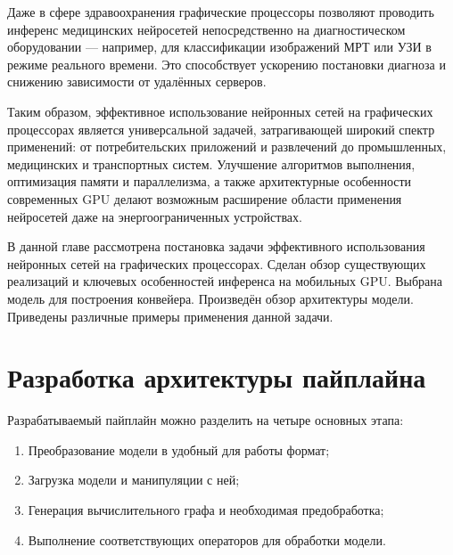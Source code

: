 \documentclass[a4paper,14pt]{extreport}
\begin{document}
        Даже в сфере здравоохранения графические процессоры позволяют проводить инференс медицинских нейросетей непосредственно на диагностическом оборудовании — например, для классификации изображений МРТ или УЗИ в режиме реального времени. Это способствует ускорению постановки диагноза и снижению зависимости от удалённых серверов.
        
        Таким образом, эффективное использование нейронных сетей на графических процессорах является универсальной задачей, затрагивающей широкий спектр применений: от потребительских приложений и развлечений до промышленных, медицинских и транспортных систем. Улучшение алгоритмов выполнения, оптимизация памяти и параллелизма, а также архитектурные особенности современных GPU делают возможным расширение области применения нейросетей даже на энергоограниченных устройствах.
        
        В данной главе рассмотрена постановка задачи эффективного использования нейронных сетей на графических процессорах. Сделан обзор существующих реализаций и ключевых особенностей инференса на мобильных GPU. Выбрана модель для построения конвейера. Произведён обзор архитектуры модели. Приведены различные примеры применения данной задачи.
        
    \chapter{Разработка архитектуры пайплайна}
        Разрабатываемый пайплайн можно разделить на четыре основных этапа:
        \begin{enumerate}
            \item Преобразование модели в удобный для работы формат;
            \item Загрузка модели и манипуляции с ней;
            \item Генерация вычислительного графа и необходимая предобработка;
            \item Выполнение соответствующих операторов для обработки модели.
        \end{enumerate}
        
\end{document}
